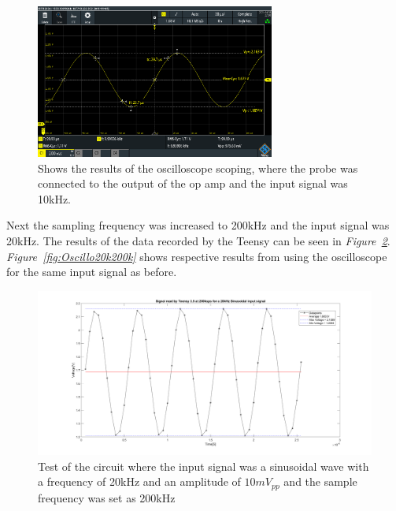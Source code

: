 \begin{figure}[h]
    \centering
    \includegraphics[width=0.7\textwidth]{graphics/10k10mvPP100ksamp.PNG}
    \caption{Shows the results of the oscilloscope scoping, where the probe was connected to the output of the op amp and the input signal was 10kHz.}
    \label{fig:Oscillo10k100k}
\end{figure}

Next the sampling frequency was increased to 200kHz and the input signal was 20kHz.
The results of the data recorded by the Teensy can be seen in \textit{Figure~\ref{fig:Teensy20k200k}}.
\textit{Figure~\ref{fig:Oscillo20k200k}} shows respective results from using the oscilloscope for the same input signal as before.

\begin{figure}[h]
    \centering
    \includegraphics[width=1.0\textwidth]{graphics/20kin_200ksampl.png}
    \caption{Test of the circuit where the input signal was a sinusoidal wave with a frequency of 20kHz and an amplitude of $10mV_{pp}$ and the sample frequency was set as 200kHz}
    \label{fig:Teensy20k200k}
\end{figure}

